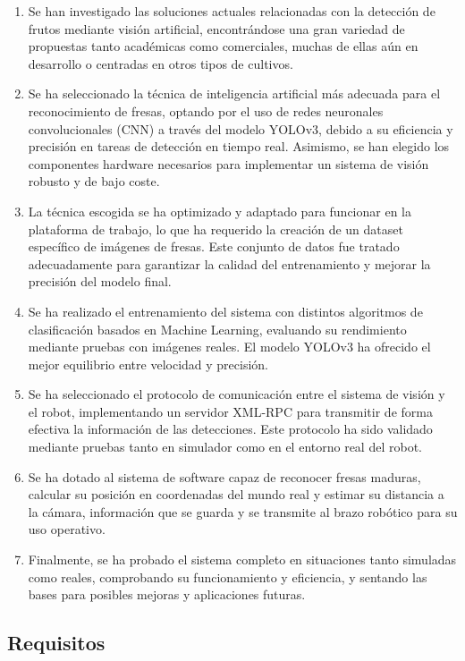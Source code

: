 \begin{enumerate}
  \item Se han investigado las soluciones actuales relacionadas con la detección de frutos mediante visión artificial, encontrándose una gran variedad de propuestas tanto académicas como comerciales, muchas de ellas aún en desarrollo o centradas en otros tipos de cultivos.
  \item Se ha seleccionado la técnica de inteligencia artificial más adecuada para el reconocimiento de fresas, optando por el uso de redes neuronales convolucionales (CNN) a través del modelo YOLOv3, debido a su eficiencia y precisión en tareas de detección en tiempo real. Asimismo, se han elegido los componentes hardware necesarios para implementar un sistema de visión robusto y de bajo coste.
  \item La técnica escogida se ha optimizado y adaptado para funcionar en la plataforma de trabajo, lo que ha requerido la creación de un dataset específico de imágenes de fresas. Este conjunto de datos fue tratado adecuadamente para garantizar la calidad del entrenamiento y mejorar la precisión del modelo final.
  \item Se ha realizado el entrenamiento del sistema con distintos algoritmos de clasificación basados en Machine Learning, evaluando su rendimiento mediante pruebas con imágenes reales. El modelo YOLOv3 ha ofrecido el mejor equilibrio entre velocidad y precisión.
  \item Se ha seleccionado el protocolo de comunicación entre el sistema de visión y el robot, implementando un servidor XML-RPC para transmitir de forma efectiva la información de las detecciones. Este protocolo ha sido validado mediante pruebas tanto en simulador como en el entorno real del robot.
  \item Se ha dotado al sistema de software capaz de reconocer fresas maduras, calcular su posición en coordenadas del mundo real y estimar su distancia a la cámara, información que se guarda y se transmite al brazo robótico para su uso operativo.
  \item Finalmente, se ha probado el sistema completo en situaciones tanto simuladas como reales, comprobando su funcionamiento y eficiencia, y sentando las bases para posibles mejoras y aplicaciones futuras.
\end{enumerate}

\subsection{Requisitos}
\label{subsec:requisitos}

